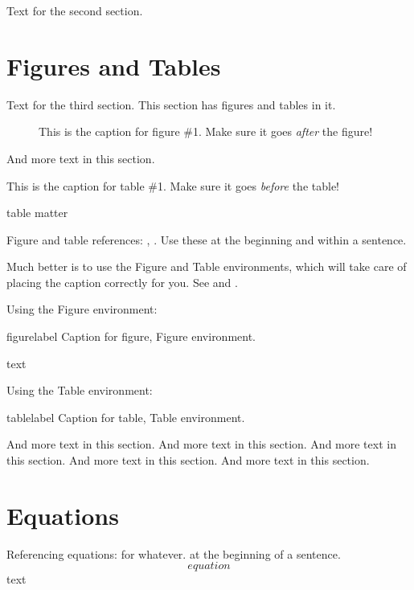 \documentclass[10pt,twoside%
		,draft%
	]{article}
\begin{document}
Text for the second section.



\section{Figures and Tables}

Text for the third section. This section has figures and tables in it.

\begin{figure}
\centering
{}
\caption{This is the caption for figure \#1. Make sure it goes
	\emph{after} the figure!}
\label{figure1}
\end{figure}

And more text in this section.

\begin{table}
\caption{This is the caption for table \#1. Make sure it goes
\emph{before} the table!}
\label{table1}
\centering
table matter
\end{table}

Figure and table references: , . Use
these at the beginning and within a sentence.

Much better is to use the Figure and Table environments, which will
take care of placing the caption correctly for you. See
 and .

Using the Figure environment:
\begin{Figure}[h]{figurelabel}%
	{Caption for figure, Figure environment.}
\end{Figure}

text

Using the Table environment:
\begin{Table}{tablelabel}%
	{Caption for table, Table environment.}
\end{Table}

And more text in this section.
And more text in this section.
And more text in this section.
And more text in this section.
And more text in this section.



\section{Equations}

Referencing equations:  for whatever.
 at the beginning of a sentence. 
%
\begin{equation}
equation
\label{equation1}
\end{equation}
%
text
\end{document}
